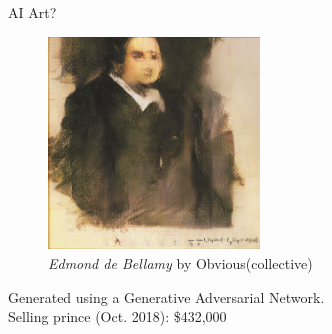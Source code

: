 \documentclass[handout]{beamer}
\begin{document}
\begin{frame}{AI Art?}
    \begin{figure}
        \centering
        \includegraphics[width=0.5\textwidth]{fig/L3/478px-Edmond_de_Belamy.png}
        \caption*{\textit{Edmond de Bellamy} by Obvious(collective)}
    \end{figure}
    Generated using a Generative Adversarial Network.\\
    Selling prince (Oct. 2018): \$432,000
\end{frame}
\end{document}
